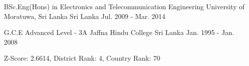 

\begin{cventries}

  \cventry
    {BSc.Eng(Hons) in Electronics and Telecommunication Engineering} %
    {University of Moratuwa, Sri Lanka} %
    {Sri Lanka} %
    {Jul. 2009 - Mar. 2014} %
    { %
    }

  \cventry
    {G.C.E Advanced Level - 3A} %
    {Jaffna Hindu College} %
    {Sri Lanka} %
    {Jan. 1995 - Jan. 2008} %
    { %
      \begin{cvitems}
        \item {Z-Score: 2.6614, District Rank: 4, Country Rank: 70}
      \end{cvitems}
    }


\end{cventries}
